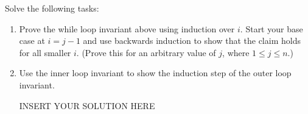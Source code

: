 Solve the following tasks:
\begin{enumerate}
	\item Prove the while loop invariant above using induction over $i$. Start your base case at $i=j-1$ and use backwards induction to show that the claim holds for all smaller $i$. (Prove this for an arbitrary value of $j$,
 where $1 \leq j \leq n$.)
	
\begin{solution}

\end{solution}
	
	\item Use the inner loop invariant to show the induction step of the outer loop invariant.
	
\begin{solution}   INSERT YOUR SOLUTION HERE   \end{solution}
	
\end{enumerate}

